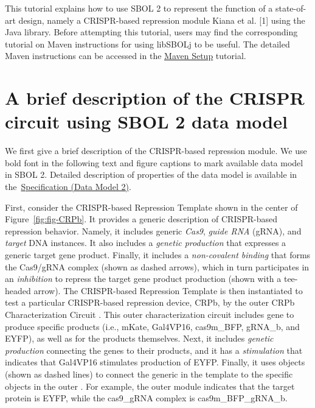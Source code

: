 This tutorial explains how to use SBOL 2 to represent the function of a state-of-art design, namely a CRISPR-based repression module Kiana et al. [1] using the Java library. Before attempting this tutorial, users may find the corresponding tutorial on Maven instructions for using libSBOLj to be useful. The detailed Maven instructions can be accessed in the  \href{http://sbolstandard.org/wp-content/uploads/2017/04/libsbolj_installation_2-2-0.pdf}{Maven Setup} tutorial. 

\section*{A brief description of the CRISPR circuit using SBOL 2 data model}
We first give a brief description of the CRISPR-based repression module. We use bold font in the following text and figure captions to mark available data model in SBOL 2. Detailed description of properties of the data model is available in the~\href{http://sbolstandard.org/downloads/specification-data-model-2-0/}{Specification
  (Data Model 2)}.

First, consider the CRISPR-based Repression Template  shown in the center of Figure~\ref{fig:fig-CRPb}. It provides a generic description of CRISPR-based repression behavior. Namely, it includes generic \emph{Cas9}, \emph{guide RNA} (gRNA), and \emph{target} DNA  instances. It also includes a \emph{genetic production}  that expresses a generic target gene product.  Finally, it includes a \emph{non-covalent binding}  that forms the Cas9/gRNA complex (shown as dashed arrows), which in turn participates in an \emph{inhibition}  to repress the target gene product production (shown with a tee-headed arrow). The CRISPR-based Repression Template is then instantiated to test a particular CRISPR-based repression device, CRPb, by the outer CRPb Characterization Circuit .  This outer characterization circuit includes gene  to produce specific products (i.e., mKate, Gal4VP16, cas9m\_BFP, gRNA\_b, and EYFP), as well as  for the products themselves.  Next, it includes \emph{genetic production}  connecting the genes to their products, and it has a \emph{stimulation}  that indicates that Gal4VP16 stimulates production of EYFP.  Finally, it uses  objects (shown as dashed lines) to connect the generic  in the template to the specific objects in the outer .  For example, the outer module indicates that the target protein is EYFP, while the cas9\_gRNA complex is cas9m\_BFP\_gRNA\_b.

